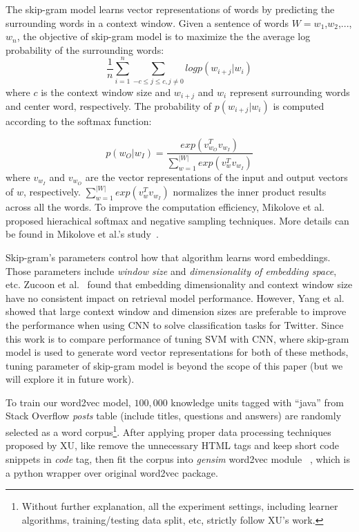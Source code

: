 \documentclass[sigconf,review, anonymous]{acmart}
\theoremstyle{break}
\begin{document}
The skip-gram model learns vector representations of words
 by predicting the surrounding words in a context window. 
 Given a sentence of words $W =w_1$,$w_2$,...,$w_n$, the objective of skip-gram model is to maximize the
 the average log probability of the surrounding words:
 \begin{equation*}
 \frac{1}{n}\sum_{i=1}^{n} \sum_{-c\leq j \leq c, j \neq 0} log p(w_{i+j}|w_i)
\end{equation*}
where $c$ is the context window size and $w_{i+j}$ and $w_{i}$ represent surrounding words and center word, respectively.
The probability of $p(w_{i+j}|w_i)$ is computed according to the softmax function:

\begin{equation*}
p(w_O|w_I) = \frac{exp(v_{w_O}^Tv_{w_I})}{\sum_{w=1}^{|W|}exp(v_{w}^Tv_{w_I})}
\end{equation*}
where $v_{w_I}$ and $v_{w_O}$ are the vector representations of the input and output vectors of $w$, respectively. 
$\sum_{w=1}^{|W|}exp(v_{w}^Tv_{w_I})$  normalizes the inner product results across all the words.
To improve the computation efficiency, Mikolove et al. ~\cite{mikolov2013distributed} proposed
hierachical softmax and negative sampling
techniques. More details can be found in Mikolove et al.'s study~\cite{mikolov2013distributed}.

Skip-gram's parameters control how that algorithm
  learns   word embeddings. Those parameters include
  {\it window size} and {\it dimensionality of embedding space}, etc. 
Zucoon et al.~\cite{zuccon2015integrating} found that embedding dimensionality
and context window size have no consistent impact on retrieval model performance. However,
Yang et al.~\cite{yang2016using} showed that large context window and dimension
 sizes are preferable to improve the performance when using CNN to solve  classification tasks
 for Twitter. Since this work is to compare performance of  tuning SVM  with CNN, where
 skip-gram model is used to generate word vector representations for both of these methods, 
 tuning parameter of skip-gram model is beyond the scope of this paper 
 (but we will explore it in future work).
 
 

To train our word2vec model, $100,000$ knowledge units tagged with ``java'' from
Stack Overflow {\it posts} table  (include titles, questions and answers)
are randomly selected as a word corpus\footnote{Without further explanation, 
all the experiment settings, including learner algorithms,
training/testing data split, etc, strictly follow XU's work. }. 
After applying proper data processing techniques proposed by XU, like
 remove the unnecessary HTML tags and keep short code snippets in
{\it code} tag, then fit the corpus into {\it gensim} word2vec module ~\cite{rehurek2010software},
which is a python wrapper over original word2vec package.
\end{document}

